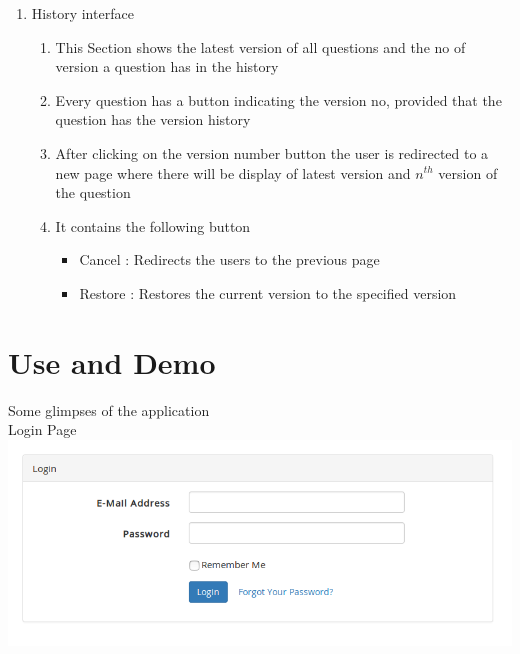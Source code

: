 \documentclass[a4paper,12pt,oneside]{book}
\begin{document}
\begin{enumerate}
        \item History interface
            \begin{enumerate}
            \item This Section shows the latest version of all questions and the no of version a question has in the history
            \item Every question has a button indicating the version no, provided that the question has the version history
            \item After clicking on the version number button the user is redirected to a new page where there will be display of latest version and \(n^{th}\) version of the question
            \item It contains the following button
                            \begin{itemize}
                                \item Cancel : Redirects the users to the previous page
                                \item Restore : Restores the current version to the specified version
                            \end{itemize}
            \end{enumerate}
    \end{enumerate}

\vspace{2in}
\section{Use and Demo}
Some glimpses of the application\\
Login Page \\
\includegraphics[scale=0.5]{login.png} \\

\vspace{0.7in}
\end{document}
